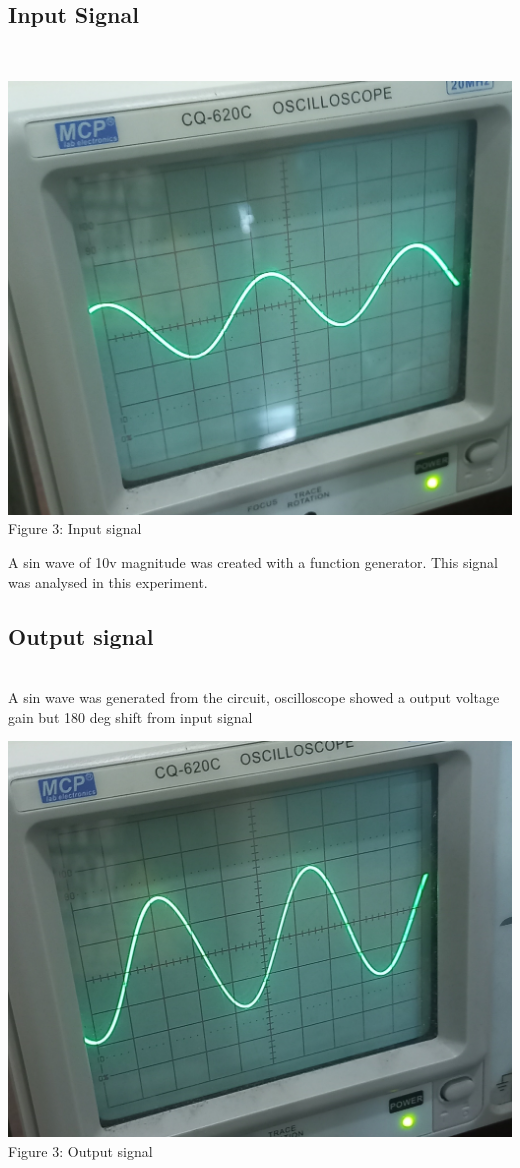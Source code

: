 \documentclass[12pt]{article}
\begin{document}
\subsection{Input Signal}\\
[1cm]
\begin{center}
    \includegraphics[scale=.09]{20220831_104505.jpg}\\
    \caption{Figure 3: Input signal}
\end{center}
A sin wave of 10v magnitude was created with a function generator. This signal was analysed in this experiment.
\subsection{Output signal}\\
[1cm]
A sin wave was generated from the circuit, oscilloscope showed a output voltage gain but 180 deg shift from input signal
\begin{center}
    \includegraphics[scale=.09]{20220831_104508.jpg}\\
    \caption{Figure 3: Output signal}
\end{center}
\end{document}
